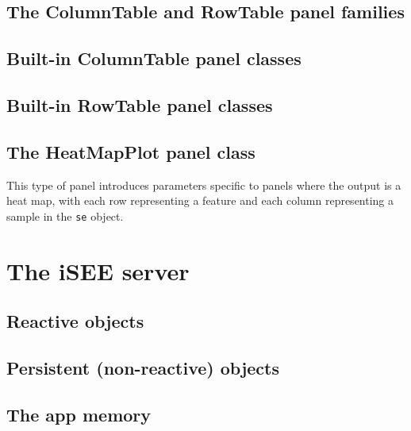 \documentclass[]{book}
\begin{document}
\hypertarget{the-columntable-and-rowtable-panel-families}{%
\section{The ColumnTable and RowTable panel families}\label{the-columntable-and-rowtable-panel-families}}

\hypertarget{built-in-columntable-panel-classes}{%
\section{Built-in ColumnTable panel classes}\label{built-in-columntable-panel-classes}}

\hypertarget{built-in-rowtable-panel-classes}{%
\section{Built-in RowTable panel classes}\label{built-in-rowtable-panel-classes}}

\hypertarget{heatmapplot-class}{%
\section{The HeatMapPlot panel class}\label{heatmapplot-class}}

This type of panel introduces parameters specific to panels where the output is a heat map, with each row representing a feature and each column representing a sample in the \texttt{se} object.

\hypertarget{server}{%
\chapter{The iSEE server}\label{server}}

\hypertarget{robjects}{%
\section{Reactive objects}\label{robjects}}

\hypertarget{persistent-non-reactive-objects}{%
\section{Persistent (non-reactive) objects}\label{persistent-non-reactive-objects}}

\hypertarget{memory}{%
\section{The app memory}\label{memory}}
\end{document}
